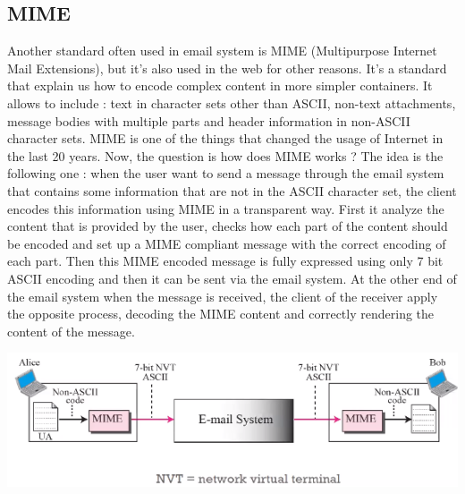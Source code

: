 \subsection{MIME}
Another standard often used in email system is MIME (Multipurpose Internet Mail Extensions), but it's also used in the web for other reasons. It's a standard that explain us how to encode complex content in more simpler containers. It allows to include : text in character sets other than ASCII, non-text attachments, message bodies with multiple parts and header information in non-ASCII character sets. MIME is one of the things that changed the usage of Internet in the last 20 years. Now, the question is how does MIME works ? The idea is the following one : when the user want to send a message through the email system that contains some information that are not in the ASCII character set, the client encodes this information using MIME in a transparent way. First it analyze the content that is provided by the user, checks how each part of the content should be encoded and set up a MIME compliant message with the correct encoding of each part. Then this MIME encoded message is fully expressed using only 7 bit ASCII encoding and then it can be sent via the email system. At the other end of the email system when the message is received, the client of the receiver apply the opposite process, decoding the MIME content and correctly rendering the content of the message.
\begin{center}
\includegraphics[scale=0.5]{./images/mime_schema.png}
\end{center}
